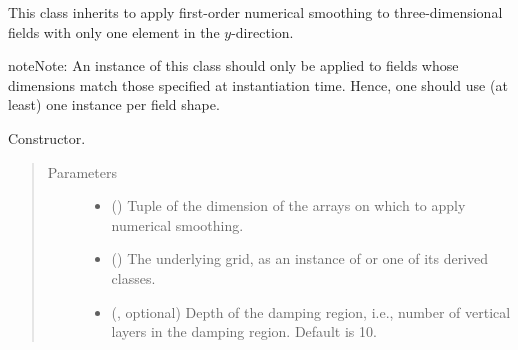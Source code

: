 \documentclass[letterpaper,10pt,english]{sphinxmanual}
\begin{document}
\begin{fulllineitems}
\label{\detokenize{api:dycore.horizontal_smoothing.HorizontalSmoothingFirstOrderXZ}}
This class inherits {\hyperref[\detokenize{api:dycore.horizontal_smoothing.HorizontalSmoothing}]{}} to apply first-order numerical smoothing to
three-dimensional fields with only one element in the \(y\)-direction.

\begin{sphinxadmonition}{note}{Note:}
An instance of this class should only be applied to fields whose dimensions match those specified at instantiation time.
Hence, one should use (at least) one instance per field shape.
\end{sphinxadmonition}

\begin{fulllineitems}
\label{\detokenize{api:dycore.horizontal_smoothing.HorizontalSmoothingFirstOrderXZ.__init__}}
Constructor.
\begin{quote}\begin{description}
\item[{Parameters}] \leavevmode\begin{itemize}
\item {} 
 () \textendash{} Tuple of the dimension of the arrays on which to apply numerical smoothing.

\item {} 
 () \textendash{} The underlying grid, as an instance of {\hyperref[\detokenize{api:grids.grid_xyz.GridXYZ}]{}} or one of its derived classes.

\item {} 
 (, optional) \textendash{} Depth of the damping region, i.e., number of vertical layers in the damping region. Default is 10.


\end{itemize}
\end{description}
\end{quote}
\end{fulllineitems}
\end{fulllineitems}
\end{document}
